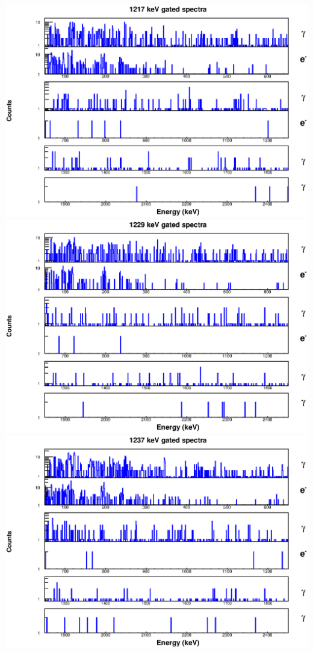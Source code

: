 \begin{landscape}
\includegraphics[scale=1.1]{154Gd_Appendix/1217_combined.eps}
\includegraphics[scale=1.1]{154Gd_Appendix/1229_combined.eps}
\includegraphics[scale=1.1]{154Gd_Appendix/1237_combined.eps}

\end{landscape}
